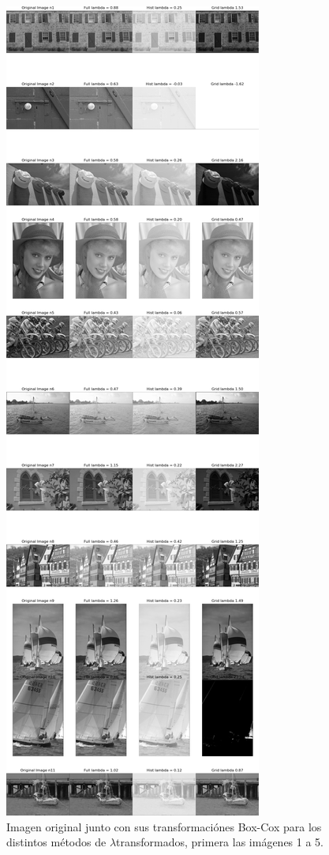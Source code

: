 \begin{figure}
    \centering
    \includegraphics[width=\textwidth]{figuras/img_BCI_all_1.png}
    \caption{Imagen original junto con sus transformaci\'ones Box-Cox para los distintos m\'etodos de $\lambda$transformados, primera las im\'agenes 1 a 5.}
\end{figure}



